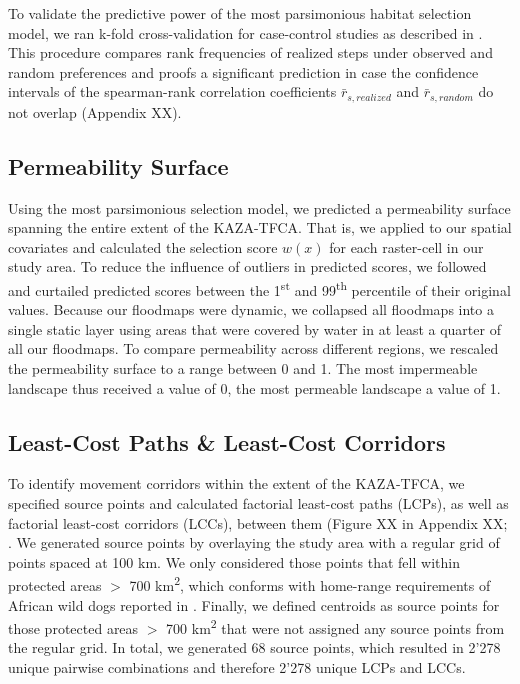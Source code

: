 \documentclass[abstract=on,10pt,a4paper,bibliography=totocnumbered]{article}
\begin{document}
To validate the predictive power of the most parsimonious habitat selection
model, we ran k-fold cross-validation for case-control studies as described in
\cite{Fortin.2009}. This procedure compares rank frequencies of realized steps
under observed and random preferences and proofs a significant prediction in
case the confidence intervals of the spearman-rank correlation coefficients
\(\bar{r}_{s, realized}\) and \(\bar{r}_{s, random}\) do not overlap (Appendix
XX).

\subsection{Permeability Surface}
Using the most parsimonious selection model, we predicted a permeability surface
spanning the entire extent of the KAZA-TFCA. That is, we applied  to
our spatial covariates and calculated the selection score \(w(x)\) for each
raster-cell in our study area. To reduce the influence of outliers in predicted
scores, we followed \cite{Squires.2013} and curtailed predicted scores between
the 1\textsuperscript{st} and 99\textsuperscript{th} percentile of their
original values. Because our floodmaps were dynamic, we collapsed all floodmaps
into a single static layer using areas that were covered by water in at least a
quarter of all our floodmaps. To compare permeability across different regions,
we rescaled the permeability surface to a range between 0 and 1. The most
impermeable landscape thus received a value of 0, the most permeable landscape a
value of 1.

\subsection{Least-Cost Paths \& Least-Cost Corridors}
To identify movement corridors within the extent of the KAZA-TFCA, we specified
source points and calculated factorial least-cost paths (LCPs), as well as
factorial least-cost corridors (LCCs), between them (Figure XX in Appendix XX;
\citealp{Adriaensen.2003, Sawyer.2011, Elliot.2014}. We generated source points
by overlaying the study area with a regular grid of points spaced at 100 km. We
only considered those points that fell within protected areas \(>\) 700
km\textsuperscript{2}, which conforms with home-range requirements of African
wild dogs reported in \cite{Pomilia.2015}. Finally, we defined centroids as
source points for those protected areas \(>\) 700 km\textsuperscript{2} that
were not assigned any source points from the regular grid. In total, we
generated 68 source points, which resulted in 2'278 unique pairwise combinations
and therefore 2'278 unique LCPs and LCCs.
\end{document}
